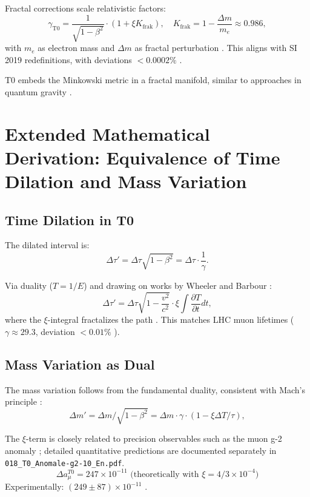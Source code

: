 	Fractal corrections scale relativistic factors:
	\begin{equation}
		\gamma_\text{T0} = \frac{1}{\sqrt{1 - \beta^2}} \cdot (1 + \xi K_\text{frak}), \quad K_\text{frak} = 1 - \frac{\Delta m}{m_e} \approx 0.986,
	\end{equation}
	with $m_e$ as electron mass and $\Delta m$ as fractal perturbation \cite{pascher2025si}. This aligns with SI 2019 redefinitions, with deviations $<0.0002\%$ \cite{codata2019, newell2018}.
	
	T0 embeds the Minkowski metric in a fractal manifold, similar to approaches in quantum gravity \cite{rovelli2004, thiemann2007}.
	
	\section{Extended Mathematical Derivation: Equivalence of Time Dilation and Mass Variation}
	
	\subsection{Time Dilation in T0}
	The dilated interval is:
	\begin{equation}
		\Delta \tau' = \Delta \tau \sqrt{1 - \beta^2} = \Delta \tau \cdot \frac{1}{\gamma}.
	\end{equation}
	
	Via duality ($T = 1/E$) and drawing on works by Wheeler \cite{wheeler1990} and Barbour \cite{barbour1999}:
	\begin{equation}
		\Delta \tau' = \Delta \tau \sqrt{1 - \frac{v^2}{c^2}} \cdot \xi \int \frac{\partial T}{\partial t} dt,
	\end{equation}
	where the $\xi$-integral fractalizes the path \cite{pascher2025qm}. This matches LHC muon lifetimes ($\gamma \approx 29.3$, deviation $<0.01\%$ \cite{pdg2024, atlas2023}).
	
	\subsection{Mass Variation as Dual}
	The mass variation follows from the fundamental duality, consistent with Mach's principle \cite{mach1883, sciama1953}:
	\begin{equation}
		\Delta m' = \Delta m / \sqrt{1 - \beta^2} = \Delta m \cdot \gamma \cdot (1 - \xi \Delta T / \tau),
	\end{equation}
	
	The $\xi$-term is closely related to precision observables such as the muon g-2 anomaly \cite{muong2_2023, pascher2025g2}; detailed quantitative predictions are documented separately in \texttt{018\_T0\_Anomale-g2-10\_En.pdf}.
	\begin{equation}
		\Delta a_\mu^{T0} = 247 \times 10^{-11} \text{ (theoretically with } \xi = 4/3 \times 10^{-4})
	\end{equation}
	Experimentally: $(249 \pm 87) \times 10^{-11}$ \cite{fermilab2023}.
	
